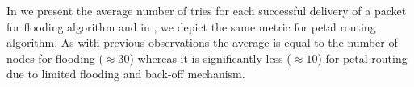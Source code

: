 In  we present the average number of tries for each successful delivery of a packet for flooding algorithm and in , we depict the same metric for petal routing algorithm. As with previous observations the average is equal to the number of nodes for flooding ($\approx 30$) whereas it is significantly less ($\approx 10$) for petal routing due to limited flooding and back-off mechanism. 